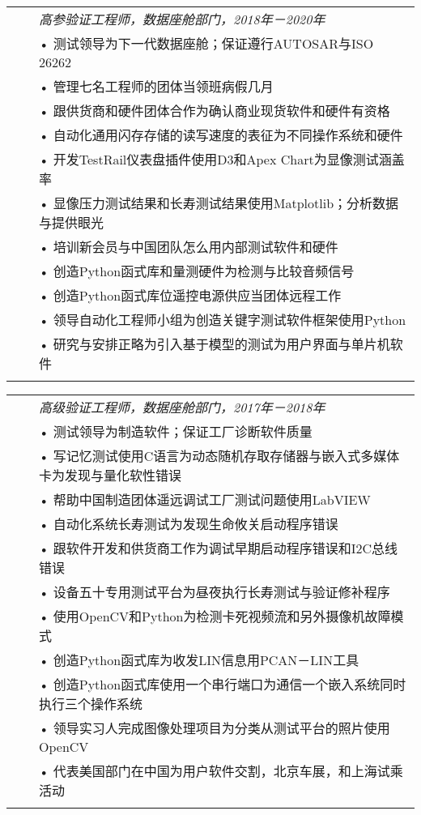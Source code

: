 \documentclass{minimal}
\begin{document}
\begin{CJK*}{UTF8}{gbsn}
\begin{tabular}{ p{1.5cm} p{1cm} p{16cm} }
& & \textit{高参验证工程师，数据座舱部门，2018年－2020年}\\
& & • 测试领导为下一代数据座舱；保证遵行AUTOSAR与ISO 26262\\
& & • 管理七名工程师的团体当领班病假几月\\
& & • 跟供货商和硬件团体合作为确认商业现货软件和硬件有资格\\
& & • 自动化通用闪存存储的读写速度的表征为不同操作系统和硬件\\
& & • 开发TestRail仪表盘插件使用D3和Apex Chart为显像测试涵盖率\\
& & • 显像压力测试结果和长寿测试结果使用Matplotlib；分析数据与提供眼光\\
& & • 培训新会员与中国团队怎么用内部测试软件和硬件\\
& & • 创造Python函式库和量测硬件为检测与比较音频信号\\
& & • 创造Python函式库位遥控电源供应当团体远程工作\\
& & • 领导自动化工程师小组为创造关键字测试软件框架使用Python\\
& & • 研究与安排正略为引入基于模型的测试为用户界面与单片机软件\\
& & \\
\end{tabular}

\begin{tabular}{ p{1.5cm} p{1cm} p{16cm} }
& & \textit{高级验证工程师，数据座舱部门，2017年－2018年}\\
& & • 测试领导为制造软件；保证工厂诊断软件质量\\
& & • 写记忆测试使用C语言为动态随机存取存储器与嵌入式多媒体卡为发现与量化软性错误\\
& & • 帮助中国制造团体遥远调试工厂测试问题使用LabVIEW\\
& & • 自动化系统长寿测试为发现生命攸关启动程序错误\\
& & • 跟软件开发和供货商工作为调试早期启动程序错误和I2C总线错误\\
& & • 设备五十专用测试平台为昼夜执行长寿测试与验证修补程序\\
& & • 使用OpenCV和Python为检测卡死视频流和另外摄像机故障模式\\
& & • 创造Python函式库为收发LIN信息用PCAN－LIN工具\\
& & • 创造Python函式库使用一个串行端口为通信一个嵌入系统同时执行三个操作系统\\
& & • 领导实习人完成图像处理项目为分类从测试平台的照片使用OpenCV\\
& & • 代表美国部门在中国为用户软件交割，北京车展，和上海试乘活动\\
& & \\
\end{tabular}


\end{CJK*}
\end{document}
